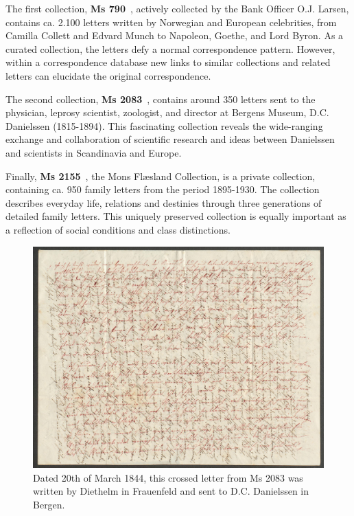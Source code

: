 \documentclass[runningheads]{llncs}
\begin{document}
The first collection, \textbf{Ms 790}~\cite{ref_url6},
actively collected by the Bank Officer O.J. Larsen, contains ca. 2.100 letters written by Norwegian and European celebrities, from Camilla
Collett and Edvard Munch to Napoleon, Goethe, and Lord Byron. As a
curated collection, the letters defy a normal correspondence
pattern. However, within a correspondence database new links to similar
collections and related letters can elucidate the original correspondence.

The second collection, \textbf{Ms 2083}~\cite{ref_url7},
contains around 350 letters sent to the physician, leprosy scientist,
zoologist, and director at Bergens Museum, D.C. Danielssen (1815-1894).
This fascinating collection reveals the wide-ranging exchange and
collaboration of scientific research and ideas between Danielssen and
scientists in Scandinavia and Europe.

Finally, \textbf{Ms 2155}~\cite{ref_url8}, the Mons Flæsland
Collection, is a private collection, containing ca. 950 family letters
from the period 1895-1930. The collection describes everyday life,
relations and destinies through three generations of detailed family
letters. This uniquely preserved collection is equally important as a
reflection of social conditions and class distinctions.

\begin{figure}[h!]
\centering
\includegraphics[width=\textwidth]{ubb-ms-2083-b-1-09_Letter_to_DCDanielssen.jpg}
\caption{Dated 20th of March 1844, this crossed letter from Ms 2083 was written by Diethelm in Frauenfeld and sent to D.C. Danielssen in Bergen.} \label{fig7}
\end{figure}
\end{document}

